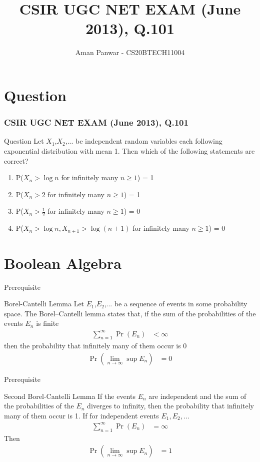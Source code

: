 \documentclass{beamer}
\title{ CSIR UGC NET EXAM (June 2013),
Q.101}
\author{Aman Panwar - CS20BTECH11004}
\providecommand{\pr}[1]{\ensuremath{\Pr\left(#1\right)}}
\providecommand{\pr}[1]{\ensuremath{\Pr\left(#1\right)}}
\theoremstyle{remark}
\numberwithin{equation}{subsection}
\begin{document}
\begin{frame}
\titlepage
\end{frame}
\section{Question}
\begin{frame}
\frametitle{ CSIR UGC NET EXAM (June 2013),
Q.101}
\begin{block}{Question}
Let $X_1$,$X_2$,... be independent random variables each following exponential distribution with mean 1. Then which of the following statements are correct?
\begin{enumerate}
    \item P($X_n > \log n$ for infinitely many $n \geq 1$) = 1
    \item P($X_n > 2$ for infinitely many $n \geq 1$) = 1
    \item P($X_n > \frac{1}{2}$ for infinitely many $n \geq 1$) = 0
    \item P($X_n > \log n, X_{n+1}>\log (n+1)$ for infinitely many $n \geq 1$) = 0
\end{enumerate}
\end{block}
\end{frame}

\section{Boolean Algebra}
\begin{frame}{Prerequisite}
\begin{block}{Borel-Cantelli Lemma}
     Let $E_1$,$E_2$,... be a sequence of events in some probability space. The Borel–Cantelli lemma states that, if the sum of the probabilities of the events $E_n$ is finite
\begin{align}
    \sum_{n=1}^{\infty}\pr{E_n}&<\infty
\end{align}
then the probability that infinitely many of them occur is 0
\begin{align}
    \pr{\lim_{n \rightarrow \infty}\sup E_n}&=0
\end{align}
\end{block}
\end{frame}


\begin{frame}{Prerequisite}
\begin{block}{Second Borel-Cantelli Lemma}
     If the events $E_n$ are independent and the sum of the probabilities of the $E_n$ diverges to infinity, then the probability that infinitely many of them occur is 1.
If for independent events $E_1,E_2,...$
\begin{align}
    \sum_{n=1}^{\infty}\pr{E_n}&=\infty
\end{align}
Then
\begin{align}
    \pr{\lim_{n \rightarrow \infty}\sup E_n}&=1
\end{align}
\end{block}
\end{frame}
\end{document}
